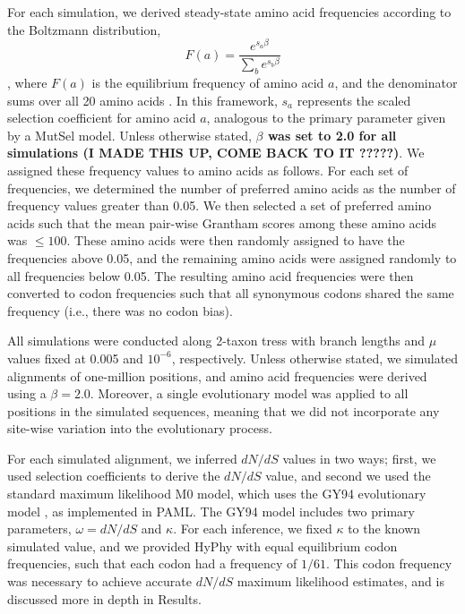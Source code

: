 \documentclass[11pt]{article}
\begin{document}
For each simulation, we derived steady-state amino acid frequencies according to the Boltzmann distribution,
\begin{equation} F(a) = \frac{e^{s_a\beta}}{\sum_b e^{s_b\beta}} \end{equation}, where $F(a)$ is the equilibrium frequency of amino acid $a$, and the denominator sums over all 20 amino acids \cite{SellaHirsh2005, Ramseyetal2011}. In this framework, $s_a$ represents the scaled selection coefficient for amino acid $a$, analogous to the primary parameter given by a MutSel model. Unless otherwise stated, \textbf{$\beta$ was set to 2.0 for all simulations (I MADE THIS UP, COME BACK TO IT ?????)}. 
We assigned these frequency values to amino acids as follows. For each set of frequencies, we determined the number of preferred amino acids as the number of frequency values greater than 0.05. We then selected a set of preferred amino acids such that the mean pair-wise Grantham scores among these amino acids was $\leq 100$. These amino acids were then randomly assigned to have the frequencies above 0.05, and the remaining amino acids were assigned randomly to all frequencies below 0.05. The resulting amino acid frequencies were then converted to codon frequencies such that all synonymous codons shared the same frequency (i.e., there was no codon bias).

All simulations were conducted along 2-taxon tress with branch lengths and $\mu$ values fixed at 0.005 and $10^{-6}$, respectively. Unless otherwise stated, we simulated alignments of one-million positions, and amino acid frequencies were derived using a $\beta = 2.0$. Moreover, a single evolutionary model was applied to all positions in the simulated sequences, meaning that we did not incorporate any site-wise variation into the evolutionary process.

For each simulated alignment, we inferred $dN/dS$ values in two ways; first, we used selection coefficients to derive the $dN/dS$ value, and second we used the standard maximum likelihood M0 model, which uses the GY94 evolutionary model \cite{GoldmanYang1994}, as implemented in PAML\cite{PAML2007}. The GY94 model includes two primary parameters, $\omega=dN/dS$ and $\kappa$. For each inference, we fixed $\kappa$ to the known simulated value, and we provided HyPhy with equal equilibrium codon frequencies, such that each codon had a frequency of $1/61$. This codon frequency was necessary to achieve accurate $dN/dS$ maximum likelihood estimates, and is discussed more in depth in Results. 
\end{document}
